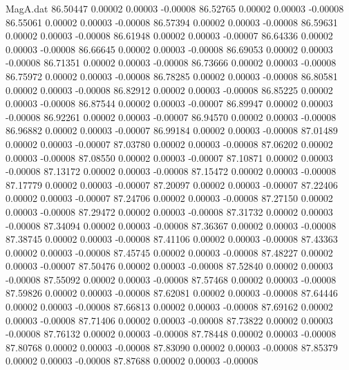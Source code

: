 \begin{filecontents}{MagA.dat}
  86.50447    0.00002    0.00003   -0.00008
  86.52765    0.00002    0.00003   -0.00008
  86.55061    0.00002    0.00003   -0.00008
  86.57394    0.00002    0.00003   -0.00008
  86.59631    0.00002    0.00003   -0.00008
  86.61948    0.00002    0.00003   -0.00007
  86.64336    0.00002    0.00003   -0.00008
  86.66645    0.00002    0.00003   -0.00008
  86.69053    0.00002    0.00003   -0.00008
  86.71351    0.00002    0.00003   -0.00008
  86.73666    0.00002    0.00003   -0.00008
  86.75972    0.00002    0.00003   -0.00008
  86.78285    0.00002    0.00003   -0.00008
  86.80581    0.00002    0.00003   -0.00008
  86.82912    0.00002    0.00003   -0.00008
  86.85225    0.00002    0.00003   -0.00008
  86.87544    0.00002    0.00003   -0.00007
  86.89947    0.00002    0.00003   -0.00008
  86.92261    0.00002    0.00003   -0.00007
  86.94570    0.00002    0.00003   -0.00008
  86.96882    0.00002    0.00003   -0.00007
  86.99184    0.00002    0.00003   -0.00008
  87.01489    0.00002    0.00003   -0.00007
  87.03780    0.00002    0.00003   -0.00008
  87.06202    0.00002    0.00003   -0.00008
  87.08550    0.00002    0.00003   -0.00007
  87.10871    0.00002    0.00003   -0.00008
  87.13172    0.00002    0.00003   -0.00008
  87.15472    0.00002    0.00003   -0.00008
  87.17779    0.00002    0.00003   -0.00007
  87.20097    0.00002    0.00003   -0.00007
  87.22406    0.00002    0.00003   -0.00007
  87.24706    0.00002    0.00003   -0.00008
  87.27150    0.00002    0.00003   -0.00008
  87.29472    0.00002    0.00003   -0.00008
  87.31732    0.00002    0.00003   -0.00008
  87.34094    0.00002    0.00003   -0.00008
  87.36367    0.00002    0.00003   -0.00008
  87.38745    0.00002    0.00003   -0.00008
  87.41106    0.00002    0.00003   -0.00008
  87.43363    0.00002    0.00003   -0.00008
  87.45745    0.00002    0.00003   -0.00008
  87.48227    0.00002    0.00003   -0.00007
  87.50476    0.00002    0.00003   -0.00008
  87.52840    0.00002    0.00003   -0.00008
  87.55092    0.00002    0.00003   -0.00008
  87.57468    0.00002    0.00003   -0.00008
  87.59826    0.00002    0.00003   -0.00008
  87.62081    0.00002    0.00003   -0.00008
  87.64446    0.00002    0.00003   -0.00008
  87.66813    0.00002    0.00003   -0.00008
  87.69162    0.00002    0.00003   -0.00008
  87.71406    0.00002    0.00003   -0.00008
  87.73822    0.00002    0.00003   -0.00008
  87.76132    0.00002    0.00003   -0.00008
  87.78448    0.00002    0.00003   -0.00008
  87.80768    0.00002    0.00003   -0.00008
  87.83090    0.00002    0.00003   -0.00008
  87.85379    0.00002    0.00003   -0.00008
  87.87688    0.00002    0.00003   -0.00008

\end{filecontents}
